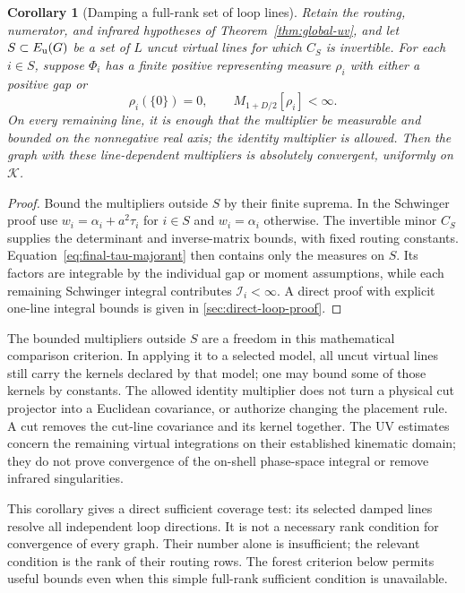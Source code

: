 \documentclass[final,5p,times,twocolumn,numbers,nopreprintline]{elsarticle}
\numberwithin{equation}{section}
\newtheorem{corollary}[theorem]{Corollary}
\theoremstyle{definition}
\theoremstyle{remark}
\newcommand{\Ph}{\Phi}
\begin{document}
\begin{corollary}[Damping a full-rank set of loop lines]
\label{cor:damped-basis}
Retain the routing, numerator, and infrared hypotheses of
Theorem~\ref{thm:global-uv}, and let \(S\subset E_{\rm u}(G)\) be a set of \(L\) uncut
virtual lines for which \(C_S\) is invertible. For each \(i\in S\), suppose
\(\Ph_i\) has a finite positive representing measure \(\rho_i\)
with either a positive gap or
\[
 \rho_i(\{0\})=0,\qquad M_{1+D/2}[\rho_i]<\infty.
\]
On every remaining line, it is enough that the multiplier be measurable
and bounded on the nonnegative real axis; the identity multiplier is allowed.
Then the graph with these line-dependent multipliers is absolutely
convergent, uniformly on \(\mathcal K\).
\end{corollary}

\begin{proof}
Bound the multipliers outside \(S\) by their finite suprema.
In the Schwinger proof use
\(w_i=\alpha_i+a^2\tau_i\) for \(i\in S\) and
\(w_i=\alpha_i\) otherwise. The invertible minor \(C_S\) supplies
the determinant and inverse-matrix bounds, with fixed routing
constants. Equation~\eqref{eq:final-tau-majorant} then contains
only the measures on \(S\). Its factors are integrable by the
individual gap or moment assumptions, while each remaining
Schwinger integral contributes \(\mathcal I_i<\infty\).
A direct proof with explicit one-line integral bounds is given in
\ref{sec:direct-loop-proof}.
\end{proof}

The bounded multipliers outside \(S\) are a freedom in this mathematical
comparison criterion. In applying it to a selected model, all uncut
virtual lines still carry the kernels declared by that model; one may
bound some of those kernels by constants. The allowed identity multiplier
does not turn a physical cut projector into a Euclidean covariance,
or authorize changing the placement rule. A cut removes the cut-line
covariance and its kernel together. The UV estimates concern the
remaining virtual integrations on their established kinematic domain;
they do not prove convergence of the on-shell phase-space integral or
remove infrared singularities.

This corollary gives a direct sufficient coverage test: its selected
damped lines resolve all independent loop directions. It is not a
necessary rank condition for convergence of every graph. Their number alone is
insufficient; the relevant condition is the rank of their routing
rows. The forest criterion below permits useful bounds even when
this simple full-rank sufficient condition is unavailable.
\end{document}
